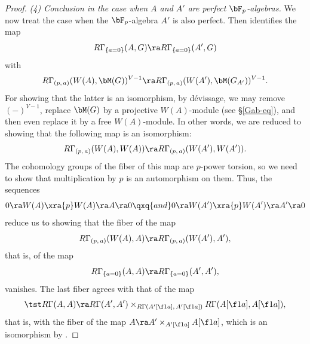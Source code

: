 \begin{proof}
\emph{(4) Conclusion in the case when $A$ and $A'$ are perfect  $\bF_p$-algebras.}
We now treat the case when the $\bF_p$-algebra $A'$ is also perfect. Then %
 identifies the map
\[
R\Gamma_{\{a = 0\}}(A, G) \ra R\Gamma_{\{a = 0\}}(A', G)
\]
with
\[
 R\Gamma_{(p,\, a)}(W(A), \bM(G))^{V - 1} \ra R\Gamma_{(p,\,  a)}(W(A'), \bM(G_{A'}))^{V - 1}.
\]
For showing that the latter is an isomorphism, by d\'{e}vissage, we may remove $(-)^{V - 1}$, replace $\bM(G)$ by a projective $W(A)$-module (see \S\ref{Gab-eq}), %
and then even replace it by a free $W(A)$-module. In other words, we are reduced to showing that the following map  is an isomorphism:
\[
R\Gamma_{(p,\,a)}(W(A), W(A)) \ra R\Gamma_{(p,\, a)}(W(A'), W(A')).
\]
The cohomology groups of the fiber of this map are $p$-power torsion, so we need to show that multiplication by $p$ is an automorphism on them. Thus, the sequences
\[
0 \ra W(A) \xra{p} W(A) \ra A \ra 0 \qxq{and} 0 \ra W(A') \xra{p} W(A') \ra A' \ra 0
\]
reduce us to showing that the fiber of the map
\[
R\Gamma_{(p,\, a)}(W(A), A) \ra R\Gamma_{(p,\, a)}(W(A'), A'),
\]
that is, of the map
\[
R\Gamma_{\{ a = 0\}}(A, A) \ra R\Gamma_{\{ a = 0\}}(A', A'),
\]
vanishes. The last fiber agrees with that of the map
\[
\tst R\Gamma(A, A) \ra R\Gamma(A', A') \times_{R\Gamma(A'[\f 1a],\, A'[\f 1a])} R\Gamma(A[\f 1a], A[\f 1a]),
\]
that is, with the fiber of the map $A\ra A' \times_{A'[\f 1a]}A[\f 1a]$, which is an isomorphism by .


\end{proof}

